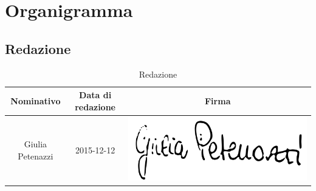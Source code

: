 \section {Organigramma}
\subsection{Redazione}
	\begin{table}[H]
		\begin{center}
		\begin{tabular}{ccc}
				\toprule
				\textbf{Nominativo} & \textbf{Data di redazione} & \textbf{Firma} \\
				\midrule
				Giulia Petenazzi & 2015-12-12 & \includegraphics[scale=0.10]{./img/Firme/giulia.png}\\
				\bottomrule
			\end{tabular}
		\end{center}
		\caption{Redazione}
	\end{table}

